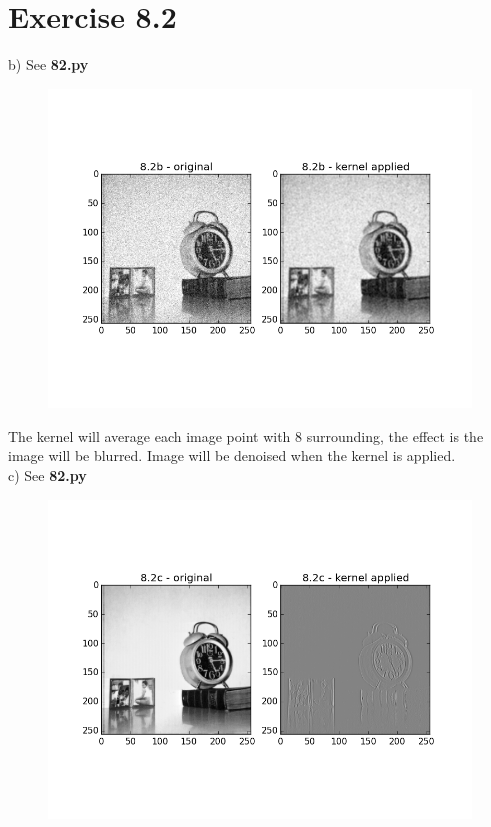 \documentclass{article}
\begin{document}
\section*{Exercise 8.2}
b) See \textbf{82.py}\\
\begin{figure}[ht]
\centering
\includegraphics[scale=0.75]{blur.png}
\end{figure}
The kernel will average each image point with 8 surrounding, the effect is the image will be blurred. Image will be denoised when the kernel is applied.\\
c) See \textbf{82.py}\\
\begin{figure}[ht]
\centering
\includegraphics[scale=0.75]{82c.png}
\end{figure}
\end{document}
